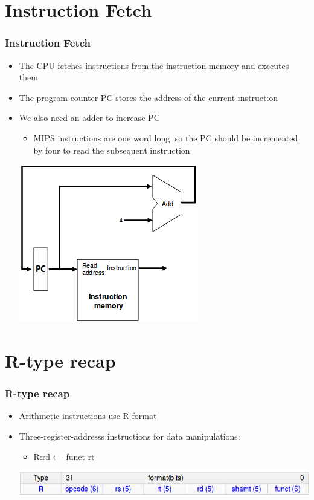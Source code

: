 \documentclass{beamer}
\begin{document}
\section{Instruction Fetch}
\begin{frame}
\frametitle{Instruction Fetch}
\begin{itemize}
\item The CPU fetches instructions from the instruction memory and executes them
\item The program counter PC stores the address of the current instruction
\item We also need an adder to increase PC
\begin{itemize}
\item MIPS instructions are one word long, so the PC should be incremented by four to read the subsequent instruction
\end{itemize}
\includegraphics[scale=0.4]{infetch.png}
\end{itemize}
\end{frame}
\section{R-type recap}
\begin{frame}
\frametitle{R-type recap}
\begin{itemize}
\item Arithmetic instructions use R-format
\item Three-register-addresss instructions for data manipulations:
\begin{itemize}
\item R:rd$\leftarrow$ funct rt
\end{itemize}
\includegraphics[scale=0.4]{r.png}
\end{itemize}
\end{frame}
\end{document}
